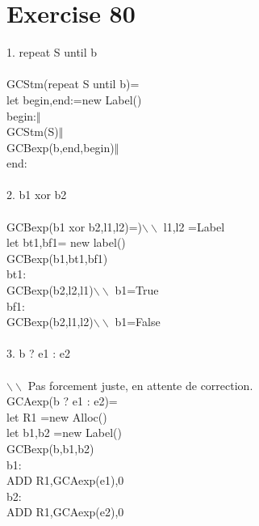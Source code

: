 \documentclass[10pt,a4paper]{article}
\begin{document}
\section{Exercise 80}
1. repeat S until b\\
\\
GCStm(repeat S until b)=\\
let begin,end:=new Label()\\
begin:$\Vert$\\
GCStm(S)$\Vert$\\
GCBexp(b,end,begin)$\Vert$\\
end:\\
\\
2. b1 xor b2\\
\\
GCBexp(b1 xor b2,l1,l2)=)$\backslash\backslash$ l1,l2 =Label\\
let bt1,bf1= new label()\\
GCBexp(b1,bt1,bf1)\\
bt1:\\
GCBexp(b2,l2,l1)$\backslash\backslash$ b1=True\\
bf1:\\
GCBexp(b2,l1,l2)$\backslash\backslash$ b1=False\\
\\
3. b ? e1 : e2\\
\\
$\backslash\backslash$ Pas forcement juste, en attente de correction.\\
GCAexp(b ? e1 : e2)=\\
let R1 =new Alloc()\\
let b1,b2 =new Label()\\
GCBexp(b,b1,b2)\\
b1:\\
ADD R1,GCAexp(e1),0\\
b2:\\
ADD R1,GCAexp(e2),0\\
\end{document}
